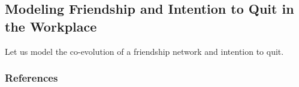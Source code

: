 \documentclass[notes, aspectratio=1610]{beamer}
\begin{document}
\subsection{Modeling Friendship and Intention to Quit in the Workplace}

\begin{frame}{}{}
	\Large 
	\centering
	Let us model the co-evolution of a friendship network and intention 
	to quit.
\end{frame}


\begin{frame}
	\frametitle{References}
	\printbibliography
 \end{frame} 

\end{document}
